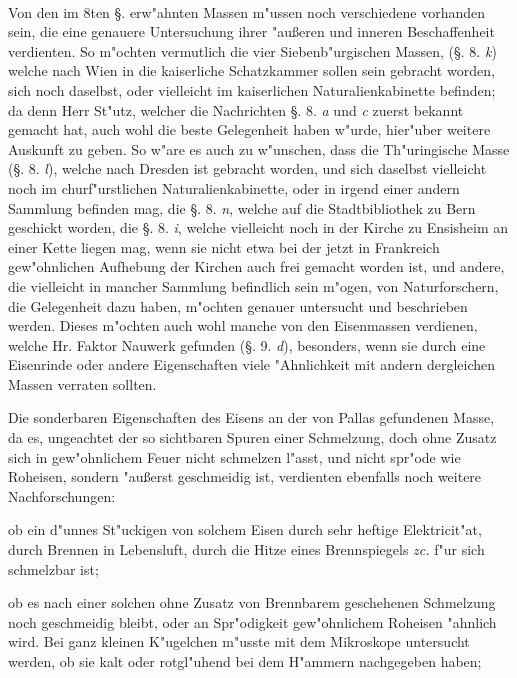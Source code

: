 \documentclass[a4paper, 11pt, oneside, polutonikogreek, german]{article}
\begin{document}
\paragraph{}
Von den im 8ten §. erw"ahnten Massen m"ussen noch verschiedene vorhanden sein, die eine genauere Untersuchung ihrer "außeren und inneren Beschaffenheit verdienten. So m"ochten vermutlich die vier Siebenb"urgischen Massen, (§. 8. \emph{k}) welche nach Wien in die kaiserliche Schatzkammer sollen sein gebracht worden, sich noch daselbst, oder vielleicht im kaiserlichen Naturalienkabinette befinden; da denn Herr St"utz, welcher die Nachrichten §. 8. \emph{a} und \emph{c} zuerst bekannt gemacht hat, auch wohl die beste Gelegenheit haben w"urde, hier"uber weitere Auskunft zu geben. So w"are es auch zu w"unschen, dass die Th"uringische Masse (§. 8. \emph{l}), welche nach Dresden ist gebracht worden, und sich daselbst vielleicht noch im churf"urstlichen Naturalienkabinette, oder in irgend einer andern Sammlung befinden mag, die §. 8. \emph{n}, welche auf die Stadtbibliothek zu Bern geschickt worden, die §. 8. \emph{i}, welche vielleicht noch in der Kirche zu Ensisheim an einer Kette liegen mag, wenn sie nicht etwa bei der jetzt in Frankreich gew"ohnlichen Aufhebung der Kirchen auch frei gemacht worden ist, und andere, die vielleicht in mancher Sammlung befindlich sein m"ogen, von Naturforschern, die Gelegenheit dazu haben, m"ochten genauer untersucht und beschrieben werden. Dieses m"ochten auch wohl manche von den Eisenmassen verdienen, welche Hr. Faktor Nauwerk gefunden (§. 9. \emph{d}), besonders, wenn sie durch eine Eisenrinde oder andere Eigenschaften viele "Ahnlichkeit mit andern dergleichen Massen verraten sollten.

Die sonderbaren Eigenschaften des Eisens an der von Pallas gefundenen Masse, da es, ungeachtet der so sichtbaren Spuren einer Schmelzung, doch ohne Zusatz sich in gew"ohnlichem Feuer nicht schmelzen l"asst, und nicht spr"ode wie Roheisen, sondern "außerst geschmeidig ist, verdienten ebenfalls noch weitere Nachforschungen:

ob ein d"unnes St"uckigen von solchem Eisen durch sehr heftige Elektricit"at, durch Brennen in Lebensluft, durch die Hitze eines Brennspiegels \emph{zc.} f"ur sich schmelzbar ist;

ob es nach einer solchen ohne Zusatz von Brennbarem geschehenen Schmelzung noch geschmeidig bleibt, oder an Spr"odigkeit gew"ohnlichem Roheisen "ahnlich wird. Bei ganz kleinen K"ugelchen m"usste mit dem Mikroskope untersucht werden, ob sie kalt oder rotgl"uhend bei dem H"ammern nachgegeben haben;
\end{document}
